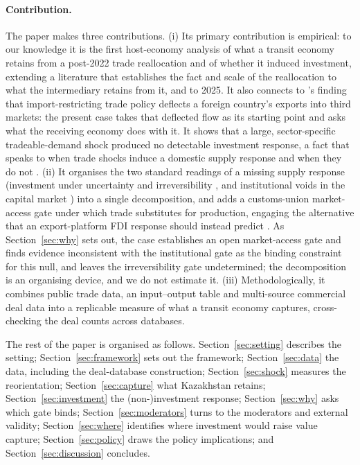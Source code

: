 \documentclass[12pt]{article}
\begin{document}
\paragraph{Contribution.} The paper makes three contributions. (i) Its primary contribution is
empirical: to our knowledge it is the first host-economy analysis of what a transit economy
retains from a post-2022 trade reallocation and of whether it induced investment, extending a
literature that establishes the fact and scale of the reallocation to what the intermediary
retains from it, and to 2025. It also connects to \citet{bowncrowley2007}'s finding that
import-restricting trade policy deflects a foreign country's exports into third markets: the
present case takes that deflected flow as its starting point and asks what the receiving
economy does with it. It shows that a large,
sector-specific tradeable-demand shock produced no detectable investment response, a fact that
speaks to when trade shocks induce a domestic supply response and when they do not
\citep{juhasz2018temporary,bloom2016trade,juhaszlanerodrik2024,gopinathneiman2014}.
(ii) It organises the two standard readings of a missing supply response (investment under
uncertainty and irreversibility \citep{dixitpindyck1994,handleylimao2015,handleylimao2017}, and
institutional voids in the
capital market \citep{khanna1997,khannapalepu2000,rajanzingales1998}) into a single
decomposition, and adds a customs-union market-access gate under which trade substitutes for
production, engaging the alternative that an export-platform FDI response should instead
predict \citep{brainard1997,helpmanmelitzyeaple2004,ekholmforslidmarkusen2007}. As Section~\ref{sec:why} sets out, the case establishes an open market-access gate
and finds evidence inconsistent with the institutional gate as the binding constraint for this
null, and leaves the
irreversibility gate undetermined; the decomposition is an organising device, and we do not
estimate it. (iii) Methodologically,
it combines public trade data, an input--output table and multi-source commercial deal data
into a replicable measure of what a transit economy captures, cross-checking the deal counts
across databases.

The rest of the paper is organised as follows. Section~\ref{sec:setting} describes the
setting; Section~\ref{sec:framework} sets out the framework; Section~\ref{sec:data} the data,
including the deal-database construction; Section~\ref{sec:shock} measures the reorientation;
Section~\ref{sec:capture} what Kazakhstan retains; Section~\ref{sec:investment} the
(non-)investment response; Section~\ref{sec:why} asks which gate binds;
Section~\ref{sec:moderators} turns to the moderators and external validity;
Section~\ref{sec:where} identifies where investment would raise value capture;
Section~\ref{sec:policy} draws the policy implications; and
Section~\ref{sec:discussion} concludes.
\end{document}
